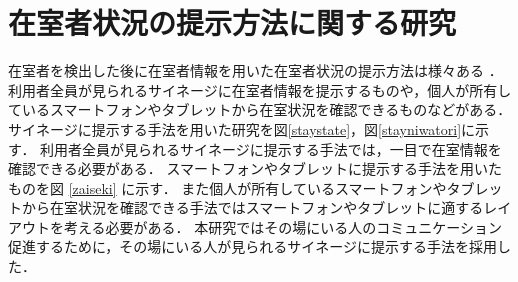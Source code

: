 \section{在室者状況の提示方法に関する研究}\label{2.3}
在室者を検出した後に在室者情報を用いた在室者状況の提示方法は様々ある
\cite{picture}
\cite{iptelephone}
\cite{staycomment}
\cite{kasika}
\cite{zaiseki}．
利用者全員が見られるサイネージに在室者情報を提示するものや，個人が所有しているスマートフォンやタブレットから在室状況を確認できるものなどがある．
サイネージに提示する手法を用いた研究を図\ref{staystate}\cite{kasika}，図\ref{stayniwatori}\cite{kasika}に示す．
利用者全員が見られるサイネージに提示する手法では，一目で在室情報を確認できる必要がある．
スマートフォンやタブレットに提示する手法を用いたものを図
\ref{zaiseki}
に示す．
また個人が所有しているスマートフォンやタブレットから在室状況を確認できる手法ではスマートフォンやタブレットに適するレイアウトを考える必要がある．
本研究ではその場にいる人のコミュニケーション促進するために，その場にいる人が見られるサイネージに提示する手法を採用した．

